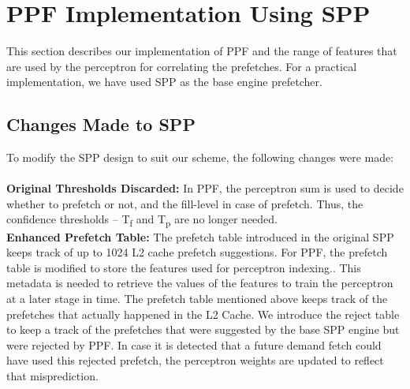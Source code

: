\section{PPF Implementation Using SPP}
\label{Impl}

This section describes our implementation of PPF and the range of
features that are used by the perceptron for correlating the
prefetches.  For a practical implementation, we have used SPP as the
base engine prefetcher.

\subsection{Changes Made to SPP}
\label{Impl-Changes}
To modify the SPP design to suit our scheme, the following changes were made: \\ \\
%
\textbf{Original Thresholds Discarded:} In PPF, the perceptron sum is used to
decide whether to prefetch or not, and the fill-level in case of prefetch.
Thus, the confidence thresholds -- T\textsubscript{f} and T\textsubscript{p}
are no longer needed. \\
%
%
%
%
\textbf{Enhanced Prefetch Table:} The prefetch table introduced in the
original SPP keeps track of up to 1024 L2 cache prefetch suggestions.  For
PPF, the prefetch table is modified to store the features used for perceptron
indexing..  This metadata is needed to retrieve the values of the features to
train the perceptron at a later stage in time. The prefetch table mentioned
above keeps track of the prefetches that actually happened in the L2 Cache.
We introduce the reject table to keep a track of the prefetches that were
suggested by the base SPP engine but were rejected by PPF.  In case it is
detected that a future demand fetch could have used this rejected prefetch,
the perceptron weights are updated to reflect that misprediction. 

